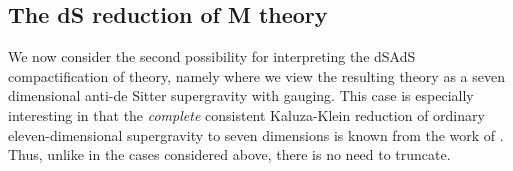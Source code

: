 \documentclass[a4paper,12pt]{article}
\begin{document}
\subsection{The dS\coordHE{} reduction of M\myHighlight{$^*$}\coordHE{} theory}

We now consider the second possibility for interpreting the
dS\myHighlight{$_4\times$}\coordHE{}AdS\coordHE{} compactification of \coordHE{} theory, namely
where we view the resulting theory as a seven dimensional anti-de
Sitter supergravity with \coordHE{} gauging.  This case is especially
interesting in that the {\it complete} consistent Kaluza-Klein
reduction of ordinary eleven-dimensional supergravity to seven
dimensions is known from the work of \cite{Nastase:1999cb,Nastase}.
Thus, unlike in the cases considered above, there is no need to
truncate.
\end{document}
